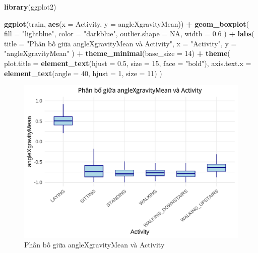 \documentclass[
]{article}
\newenvironment{Shaded}{\begin{snugshade}}{\end{snugshade}}
\newcommand{\AttributeTok}[1]{\textcolor[rgb]{0.13,0.29,0.53}{#1}}
\newcommand{\ConstantTok}[1]{\textcolor[rgb]{0.56,0.35,0.01}{#1}}
\newcommand{\DecValTok}[1]{\textcolor[rgb]{0.00,0.00,0.81}{#1}}
\newcommand{\FloatTok}[1]{\textcolor[rgb]{0.00,0.00,0.81}{#1}}
\newcommand{\FunctionTok}[1]{\textcolor[rgb]{0.13,0.29,0.53}{\textbf{#1}}}
\newcommand{\NormalTok}[1]{#1}
\newcommand{\SpecialCharTok}[1]{\textcolor[rgb]{0.81,0.36,0.00}{\textbf{#1}}}
\newcommand{\StringTok}[1]{\textcolor[rgb]{0.31,0.60,0.02}{#1}}
\begin{document}
\begin{Shaded}
\begin{Highlighting}[]
\FunctionTok{library}\NormalTok{(ggplot2)}

\FunctionTok{ggplot}\NormalTok{(train, }\FunctionTok{aes}\NormalTok{(}\AttributeTok{x =}\NormalTok{ Activity, }\AttributeTok{y =}\NormalTok{ angleXgravityMean)) }\SpecialCharTok{+}
  \FunctionTok{geom\_boxplot}\NormalTok{(}
    \AttributeTok{fill =} \StringTok{"lightblue"}\NormalTok{,}
    \AttributeTok{color =} \StringTok{"darkblue"}\NormalTok{,}
    \AttributeTok{outlier.shape =} \ConstantTok{NA}\NormalTok{,}
    \AttributeTok{width =} \FloatTok{0.6}
\NormalTok{  ) }\SpecialCharTok{+}
  \FunctionTok{labs}\NormalTok{(}
    \AttributeTok{title =} \StringTok{"Phân bố giữa angleXgravityMean và Activity"}\NormalTok{,}
    \AttributeTok{x =} \StringTok{"Activity"}\NormalTok{,}
    \AttributeTok{y =} \StringTok{"angleXgravityMean"}
\NormalTok{  ) }\SpecialCharTok{+}
  \FunctionTok{theme\_minimal}\NormalTok{(}\AttributeTok{base\_size =} \DecValTok{14}\NormalTok{) }\SpecialCharTok{+}
  \FunctionTok{theme}\NormalTok{(}
    \AttributeTok{plot.title =} \FunctionTok{element\_text}\NormalTok{(}\AttributeTok{hjust =} \FloatTok{0.5}\NormalTok{, }\AttributeTok{size =} \DecValTok{15}\NormalTok{, }\AttributeTok{face =} \StringTok{"bold"}\NormalTok{),}
    \AttributeTok{axis.text.x =} \FunctionTok{element\_text}\NormalTok{(}\AttributeTok{angle =} \DecValTok{40}\NormalTok{, }\AttributeTok{hjust =} \DecValTok{1}\NormalTok{, }\AttributeTok{size =} \DecValTok{11}\NormalTok{)}
\NormalTok{  )}
\end{Highlighting}
\end{Shaded}

\begin{figure}
\centering
\includegraphics{report_files/figure-latex/unnamed-chunk-15-1.pdf}
\caption{Phân bố giữa angleXgravityMean và Activity}
\end{figure}
\end{document}
